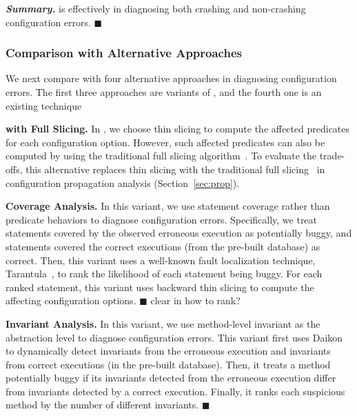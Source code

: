 \vspace{1mm}
\noindent \textbf{\textit{Summary.}} \ourtool is effectively
in diagnosing both crashing and non-crashing configuration errors. $\blacksquare$


\subsubsection{Comparison with Alternative Approaches}
\label{sec:comparison}

We next compare \ourtool with four alternative approaches
in diagnosing configuration errors.
The first three approaches are variants of \ourtool,
and the fourth one is an existing technique~\cite{Rabkin:2011:PPC}

\vspace{1mm}
\noindent \textbf{\ourtool with Full Slicing.} 
In \ourtool, we choose thin slicing to compute the affected predicates for
each configuration option. However, such affected predicates
can also be computed by using the traditional full slicing algorithm~\cite{Horwitz:1988}.
To evaluate the trade-offs, this alternative replaces
thin slicing with the traditional
full slicing~\cite{Horwitz:1988} in configuration
propagation analysis (Section~\ref{sec:prop}).

\vspace{1mm}
\noindent \textbf{Coverage Analysis.}
In this variant, we use statement coverage rather than
predicate behaviors to diagnose configuration errors. Specifically,
we treat statements covered by the observed erroneous execution as
potentially buggy, and statements covered the correct executions (from
the pre-built database) as correct. Then, this variant uses
a well-known fault localization technique, Tarantula~\cite{},
to rank the likelihood of each statement being buggy.
For each ranked statement, this variant uses backward thin slicing
to compute the affecting configuration options. $\blacksquare$ clear in
how to rank?


\vspace{1mm}
\noindent \textbf{Invariant Analysis.}
In this variant, we use method-level invariant as the abstraction level
to diagnose configuration errors. This variant first uses
Daikon~\cite{} to dynamically
detect invariants from the erroneous execution  and invariants
from correct executions (in the pre-built database). Then, it
treats a method potentially buggy if its invariants detected
from the erroneous execution differ from invariants detected
by a correct execution. Finally, it ranks each suspicious
method by the number of different invariants. $\blacksquare$



